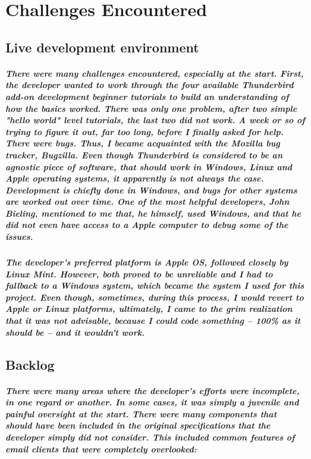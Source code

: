 \chapter{Challenges Encountered}

\section{Live development environment}
\paragraph{There were many challenges encountered, especially at the start. First, the developer wanted to work through the four available Thunderbird add-on development beginner tutorials to build an understanding of how the basics worked. There was only one problem, after two simple "hello world" level tutorials, the last two did not work. A week or so of trying to figure it out, far too long, before I finally asked for help. There were bugs. Thus, I became acquainted with the Mozilla bug tracker, \emph{Bugzilla}. Even though Thunderbird is considered to be an agnostic piece of software, that should work in Windows, Linux and Apple operating systems, it apparently is not always the case. Development is chiefly done in Windows, and bugs for other systems are worked out over time. One of the most helpful developers, John Bieling, mentioned to me that, he himself, used Windows, and that he did not even have access to a Apple computer to debug some of the issues.}

\paragraph{The developer's preferred platform is Apple OS, followed closely by Linux Mint. However, both proved to be unreliable  and I had to fallback to a Windows system, which became the system I used for this project. Even though, sometimes, during this process, I would revert to Apple or Linux platforms, ultimately, I came to the grim realization that it was not advisable, because I could code something -- 100\% as it should be -- and it wouldn't work.}

\section{Backlog}

\paragraph{There were many areas where the developer's efforts were incomplete, in one regard or another. In some cases, it was simply a juvenile and painful oversight at the start. There were many components that should have been included in the original specifications that the developer simply did not consider. This included common features of email clients that were completely overlooked:} 

